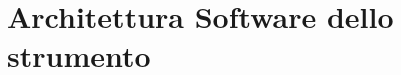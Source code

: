 \chapter{Architettura Software dello strumento}
\label{capitolo4}
\thispagestyle{empty}

\noindent %

